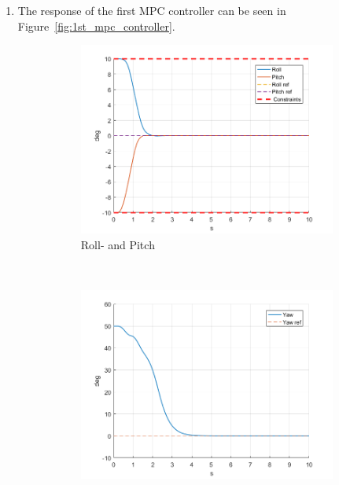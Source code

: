\documentclass[11pt]{article}
\begin{document}
\begin{enumerate}
    The P-matrix shown above results from the implementation of an LQR-controller based on the system model as well as Q and R.
    
    \begin{verbatim}
    [K_inf,P_inf,~] = dlqr(sys.A,sys.B,Q,R);
    \end{verbatim}
    
    Consequently we apply the resulting control-law to get a closed loop system. After imposing state- and input constraints we are ultimately able to calculate the final set which in this case is the \textbf{LQR maximum control invariant set}.

    \item The response of the first MPC controller can be seen in
    Figure~\ref{fig:1st_mpc_controller}.
    \begin{figure}[ht]
        \centering
        \begin{subfigure}[c]{0.3\linewidth}
            \centering
            \includegraphics[width=\linewidth]{Plots_03_FirstMPCController/01}
            \caption{Roll- and Pitch}
        \end{subfigure}
        ~
        \begin{subfigure}[c]{0.3\linewidth}
            \centering
            \includegraphics[width=\linewidth]{Plots_03_FirstMPCController/02}

\end{subfigure}
\end{figure}
\end{enumerate}
\end{document}
